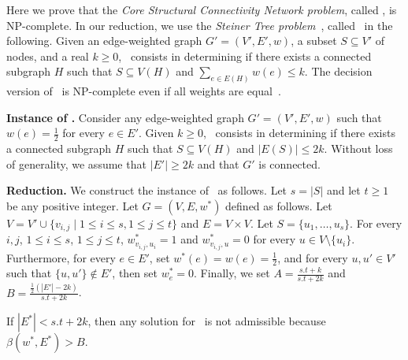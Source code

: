 Here we prove that the \emph{Core Structural Connectivity Network problem}, called \PROBLEM, is NP-complete. In our reduction, we use the \emph{Steiner Tree problem}~\cite{Garey1979}, called \STEINER~in the
following. Given an edge-weighted graph $G' = (V',E',w)$, a subset
$S \subseteq V'$ of nodes, and a real $k \geq 0$, \STEINER~consists in
determining if there exists a connected subgraph $H$ such that $S \subseteq V(H)$ and $\sum_{e \in E(H)}{w(e)} \leq k$.
The decision version of \STEINER~is NP-complete even if all weights are equal~\cite{Garey1979}.

\smallskip

\textbf{Instance of \STEINER.}
Consider any edge-weighted graph $G' = (V',E',w)$ such that $w(e) =
\frac{1}{2}$ for every $e \in E'$.
Given $k \geq 0$, \STEINER~consists in determining if there exists a
connected subgraph $H$ such that $S \subseteq V(H)$ and $|E(S)| \leq
2k$.
Without loss of generality, we assume that $|E'| \geq 2k$ and that
$G'$ is connected.

\smallskip

\textbf{Reduction.}
We construct the instance of \PROBLEM~as follows.
Let $s = |S|$ and let $t \geq 1$ be any positive integer.
Let $G = (V,E,w^{*})$ defined as follows.
Let $V = V' \cup \{v_{i,j} \mid 1 \leq i \leq s, 1 \leq j \leq t\}$
and $E = V \times V$.
Let $S = \{u_{1}, \ldots, u_{s}\}$.
For every $i,j$, $1 \leq i \leq s$, $1 \leq j \leq t$,
$w^{*}_{v_{i,j},u_{i}} = 1$ and $w^{*}_{v_{i,j},u} = 0$ for every $u
\in V \setminus \{u_{i}\}$.
Furthermore, for every $e \in E'$, set $w^*(e) = w(e) =
\frac{1}{2}$, and for every $u,u' \in V'$ such that $\{u,u'\} \notin
E'$, then set $w^*_{e} = 0$.
Finally, we set $A = \frac{s.t+k}{s.t+2k}$ and $B =
\frac{\frac{1}{2}(|E'|-2k)}{s.t+2k}$.


\begin{lemma}
\label{lem:beta}
If $|E^*| < s.t+2k$, then any solution for \PROBLEM~is not
admissible because $\beta(w^{*},E^*) > B$.
\end{lemma}

